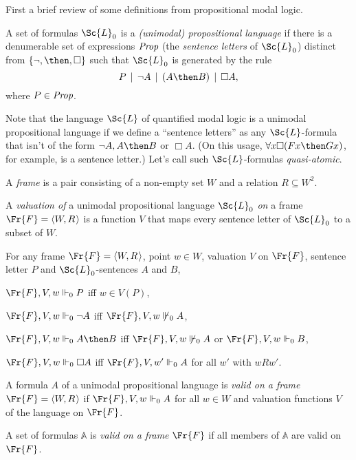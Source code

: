 \documentclass[11pt]{woarticle}
\theoremstyle{break}
\theoremstyle{nonumberplain}
\newcommand{\SAT}{\Vdash}
\newcommand{\1}{\;\,|\;\,}
\renewcommand{\t}[1]{\ensuremath{\langle #1  \makebox[.2ex]{}\rangle}}
\begin{document}
First a brief review of some definitions from propositional modal logic.

\begin{definition}{\label{!PROPLANG}}
  A set of formulas $\Sc{L}_0$ is a \emph{(unimodal) propositional language} if
  there is a denumerable set of expressions $\emph{Prop}$ (the \emph{sentence
    letters} of $\Sc{L}_0$) distinct from $\{ \neg, \then, \Box \}$ such that
  $\Sc{L}_0$ is generated by the rule
  \[
    P \1 \neg A \1 (A \then B) \1 \Box A,
  \]
  where $P \in \emph{Prop}$.
\end{definition}

Note that the language $\Sc{L}$ of quantified modal logic is a unimodal
propositional language if we define a ``sentence letters'' as any
$\Sc{L}$-formula that isn't of the form $\neg A, A \then B$ or $\Box A$. (On
this usage, $\forall x \Box (Fx \then Gx)$, for example, is a sentence letter.)
Let's call such $\Sc{L}$-formulas \emph{quasi-atomic}.

\begin{definition}{\label{!FRAME}}
  A \emph{frame} is a pair consisting of a non-empty set $W$ and a relation
  $R \subseteq W^2$.

  \medskip\noindent
  A \emph{valuation of} a unimodal propositional language $\Sc{L}_0$
  \emph{on} a frame $\Fr{F} = \t{W,R}$ is a function $V$ that maps
  every sentence letter of $\Sc{L}_0$ to a subset of $W$.
\end{definition}

\begin{definition}{\label{!KRIPKE}}
  For any frame $\Fr{F}=\t{W,R}$, point $w\in W$, valuation $V$ on
  $\Fr{F}$, sentence letter $P$ and $\Sc{L}_{0}$-sentences $A$ and $B$,
  \begin{semantics}
  \item[$\Fr{F},V,w \SAT_0 P$] iff $w\in V(P)$,
  \item[$\Fr{F},V,w \SAT_0 \neg A$] iff $\Fr{F},V,w \not\SAT_0 A$,
  \item[$\Fr{F},V,w \SAT_0 A \then B$] iff $\Fr{F},V,w \not\SAT_0 A$
    or $\Fr{F},V,w \SAT_0 B$,
  \item[$\Fr{F},V,w \SAT_0 \Box A$] iff $\Fr{F},V,w' \SAT_0 A$ for
    all $w'$ with $wRw'$.
  \end{semantics}
\end{definition}

\begin{definition}{\label{!FRAMEVAL}}
  A formula $A$ of a unimodal propositional language is \emph{valid on
    a frame} $\Fr{F} = \t{W,R}$ if $\Fr{F},V,w \SAT_0 A$ for all
  $w\in W$ and valuation functions $V$ of the language on $\Fr{F}$.

  A set of formulas $\mathbb{A}$ is \emph{valid on a frame} $\Fr{F}$ if all
  members of $\mathbb{A}$ are valid on $\Fr{F}$.
\end{definition}
\end{document}
